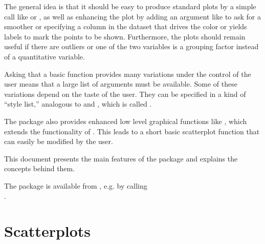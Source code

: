 \documentclass[11pt]{article}\usepackage[]{graphicx}\usepackage[]{color}
\begin{document}
The general idea is that it should be easy to produce standard plots 
by a simple call like  or , 
as well as enhancing the plot by adding an argument like  
to ask for a smoother or specifying 
a column in the dataset that drives the color or yields labels to mark the
points to be shown. 
Furthermore, the plots should remain useful if there are outliers 
or one of the two
variables is a grouping factor instead of a quantitative variable.

Asking that a basic function provides many variations under the control of
the user means that a large list of arguments must be available.
Some of these variations depend on the taste of the user. 
They can be specified in a kind of ``style list,'' analogous to 
 and , which is called .

The package also provides enhanced low level graphical functions
like , which extends the functionality of .
This leads to a short basic scatterplot function  that can
easily be modified by the user.

This document presents the main features of the package 
and explains the concepts behind them. 

The package is available from , e.g. by calling\\
.\\

\section{Scatterplots}
\end{document}
